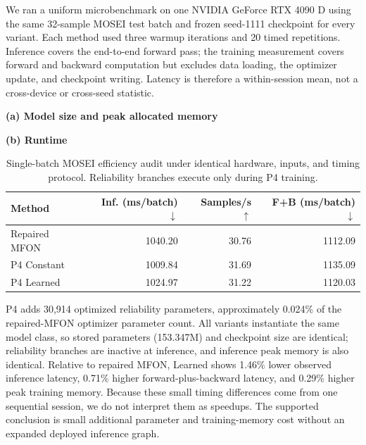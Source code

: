 We ran a uniform microbenchmark on one NVIDIA GeForce RTX 4090 D using the
same 32-sample MOSEI test batch and frozen seed-1111 checkpoint for every
variant. Each method used three warmup iterations and 20 timed repetitions.
Inference covers the end-to-end forward pass; the training measurement covers
forward and backward computation but excludes data loading, the optimizer
update, and checkpoint writing. Latency is therefore a within-session mean,
not a cross-device or cross-seed statistic.

\begin{table}[t]
\caption{Single-batch MOSEI efficiency audit under identical hardware,
inputs, and timing protocol. Reliability branches execute only during P4
training.}
\label{tab:efficiency-audit}
\centering
\small
\textbf{(a) Model size and peak allocated memory}\par\smallskip
{}

\vspace{0.7em}
\textbf{(b) Runtime}\par\smallskip
\begin{tabular}{lrrr}
\toprule
Method & Inf. (ms/batch) $\downarrow$ & Samples/s $\uparrow$
& F+B (ms/batch) $\downarrow$ \\
\midrule
Repaired MFON & 1040.20 & 30.76 & 1112.09 \\
P4 Constant & 1009.84 & 31.69 & 1135.09 \\
P4 Learned & 1024.97 & 31.22 & 1120.03 \\
\bottomrule
\end{tabular}
\end{table}

P4 adds 30,914 optimized reliability parameters, approximately 0.024\% of
the repaired-MFON optimizer parameter count. All variants instantiate the
same model class, so stored parameters (153.347M) and checkpoint size are
identical; reliability branches are inactive at inference, and inference peak
memory is also identical. Relative to repaired MFON, Learned shows 1.46\%
lower observed inference latency, 0.71\% higher forward-plus-backward latency,
and 0.29\% higher peak training memory. Because these small timing differences
come from one sequential session, we do not interpret them as speedups. The
supported conclusion is small additional parameter and training-memory cost
without an expanded deployed inference graph.


